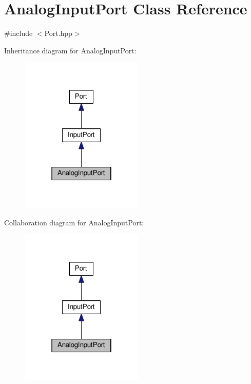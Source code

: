 \hypertarget{classAnalogInputPort}{}\section{Analog\+Input\+Port Class Reference}
\label{classAnalogInputPort}


{\ttfamily \#include $<$Port.\+hpp$>$}



Inheritance diagram for Analog\+Input\+Port\+:\nopagebreak
\begin{figure}[H]
\begin{center}
\leavevmode
\includegraphics[width=166pt]{classAnalogInputPort__inherit__graph}
\end{center}
\end{figure}


Collaboration diagram for Analog\+Input\+Port\+:\nopagebreak
\begin{figure}[H]
\begin{center}
\leavevmode
\includegraphics[width=166pt]{classAnalogInputPort__coll__graph}
\end{center}
\end{figure}

